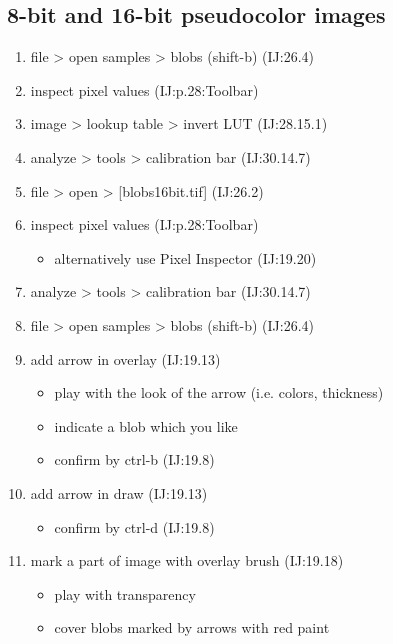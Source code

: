 \documentclass[11pt]{article}
\begin{document}
\subsection{8-bit and 16-bit pseudocolor images}
\label{sec-1-6}
\begin{enumerate}
\item file > open samples > blobs (shift-b) (IJ:26.4)
\item inspect pixel values (IJ:p.28:Toolbar)
\item image > lookup table > invert LUT (IJ:28.15.1)
\item analyze > tools > calibration bar (IJ:30.14.7)

\item file > open > [blobs16bit.tif] (IJ:26.2)
\item inspect pixel values (IJ:p.28:Toolbar)
\begin{itemize}
\item alternatively use Pixel Inspector (IJ:19.20)
\end{itemize}
\item analyze > tools > calibration bar (IJ:30.14.7)

\item file > open samples > blobs (shift-b) (IJ:26.4)
\item add arrow in overlay (IJ:19.13)
\begin{itemize}
\item play with the look of the arrow (i.e. colors, thickness)
\item indicate a blob which you like
\item confirm by ctrl-b (IJ:19.8)
\end{itemize}
\item add arrow in draw (IJ:19.13)
\begin{itemize}
\item confirm by ctrl-d (IJ:19.8)
\end{itemize}
\item mark a part of image with overlay brush (IJ:19.18)
\begin{itemize}
\item play with transparency
\item cover blobs marked by arrows with red paint
\end{itemize}
\end{enumerate}
\end{document}
